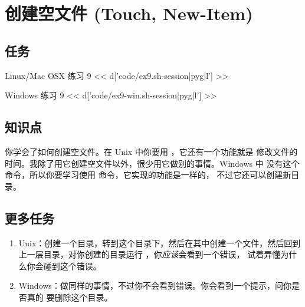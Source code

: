 \chapter{创建空文件 (Touch, New-Item)}

\section{任务}

\begin{code}{Linux/Mac OSX 练习 9}
<< d['code/ex9.sh-session|pyg|l'] >>
\end{code}

\begin{code}{Windows 练习 9}
<< d['code/ex9-win.sh-session|pyg|l'] >>
\end{code}

\section{知识点}

你学会了如何创建空文件。在 Unix 中你要用 ，它还有一个功能就是
修改文件的时间。我除了用它创建空文件以外，很少用它做别的事情。Windows 中
没有这个命令，所以你要学习使用   命令，它实现的功能是一样的，
不过它还可以创建新目录。

\section{更多任务}

\begin{enumerate}
\item Unix：创建一个目录，转到这个目录下，然后在其中创建一个文件，然后回到
    上一层目录，对你创建的目录运行 ，你\emph{应该}会看到一个错误，
    试着弄懂为什么你会碰到这个错误。
\item Windows：做同样的事情，不过你不会看到错误。你会看到一个提示，问你是否真的
    要删除这个目录。
\end{enumerate}

